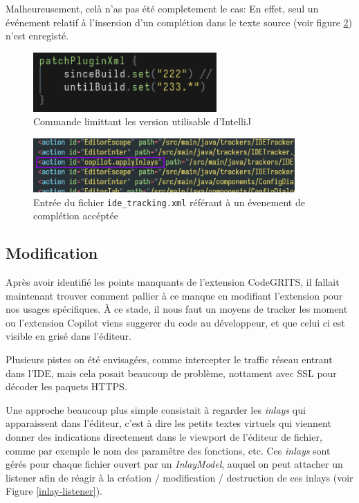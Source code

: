 Malheureusement, celà n'as pas été completement le cas: En effet, seul un événement relatif à l'insersion d'un complétion dans le texte source
(voir figure \ref{apply-inlay-action}) n'est enregisté.

\begin{figure}
  \centering
  \includegraphics[width=7cm]{images/codegrits-wrong-version.png}
  \caption{Commande limittant les version utilisable d'IntelliJ}
  \label{codegrits-old-build-version}
\end{figure}

\begin{figure}
  \centering
  \includegraphics[width=10cm]{images/apply-inlay-action.png}
  \caption{Entrée du fichier \lstinline{ide_tracking.xml} référant à un évenement de complétion accéptée}
  \label{apply-inlay-action}
\end{figure}


\subsection{Modification}

Après avoir identifié les points manquants de l'extension CodeGRITS, il fallait maintenant trouver comment pallier à ce manque
en modifiant l'extension pour nos usages spécifiques.
À ce stade, il nous faut un moyens de tracker les moment ou l'extension Copilot viens suggerer du code au développeur, et que celui ci est visible
en grisé dans l'éditeur.

Plusieurs pistes on été envisagées, comme intercepter le traffic réseau entrant dans l'IDE, mais cela posait beaucoup de problème, nottament avec SSL pour décoder les paquets HTTPS.

Une approche beaucoup plus simple consistait à regarder les \emph{inlays} qui apparaissent dans l'éditeur,
c'est à dire les petits textes virtuels qui viennent donner des indications directement dans le viewport de l'éditeur de fichier,
comme par exemple le nom des paramêtre des fonctions, etc.
Ces \emph{inlays} sont gérés pour chaque fichier ouvert par un \emph{InlayModel}, auquel on peut attacher un listener afin de réagir
à la création / modification / destruction de ces inlays (voir Figure \ref{inlay-listener}).

